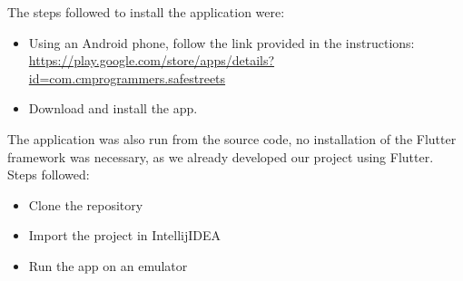 The steps followed to install the application were:\\
\begin{itemize}
    \item 
    Using an Android phone, follow the link provided in the instructions: \url{https://play.google.com/store/apps/details?id=com.cmprogrammers.safestreets}
    \item
    Download and install the app.
\end{itemize}

The application was also run from the source code, no installation of the Flutter framework was necessary, as we already developed our project using Flutter. Steps followed:
\begin{itemize}
    \item 
    Clone the repository
    \item
    Import the project in IntellijIDEA
    \item
    Run the app on an emulator
\end{itemize}
